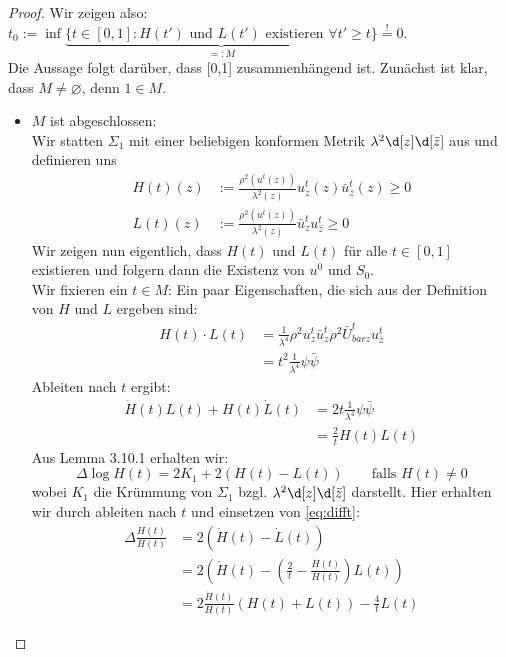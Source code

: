 \begin{proof}
  Wir zeigen also: $t_0 := \inf \underbrace{\{t \in [0,1] : H(t') \text{ und } L(t') \text{ existieren } \forall t' \geq t \}}_{ =: M} \stackrel{!}{=} 0$. \\
  Die Aussage folgt darüber, dass [0,1] zusammenhängend ist. Zunächst ist klar, dass $M \neq \varnothing$, denn $1 \in M$.
  \begin{itemize}
    \item $M$ ist abgeschlossen: \\
      Wir statten $\Sigma_1$ mit einer beliebigen konformen Metrik $\lambda^2 \d[z]\d[\bar z]$ aus und definieren uns
      \begin{align*}
	H(t)(z) & := \frac{\rho^2(u^t(z))}{\lambda^2(z)} u^t_z(z) \bar u^t_{\bar z}(z) \geq 0 \\
	L(t)(z) & := \frac{\rho^2(u^t(z))}{\lambda^2(z)} \bar u^t_z u^t_{\bar z} \geq 0
      \end{align*}
      Wir zeigen nun eigentlich, dass $H(t)$ und $L(t)$ für alle $t \in [0,1]$ existieren und folgern dann die Existenz von $u^0$ und $S_0$. \\
      Wir fixieren ein $t \in M$:
      Ein paar Eigenschaften, die sich aus der Definition von $H$ und $L$ ergeben sind:
      \begin{align*}
	H(t) \cdot L(t) & = \frac{1}{\lambda^4} \rho^2 u^t_z \bar u^t_z \rho^2 \bar U^t_{bar z} u^t_{\bar z} \\
	& = t^2 \frac{1}{\lambda^4} \psi \bar \psi \tag{1} \label{eq:HL}
      \end{align*}
      Ableiten nach $t$ ergibt:
      \begin{align*}
	\dot H(t) L(t) + H(t) \dot L(t) & = 2t \frac{1}{\lambda^4} \psi \bar \psi \\
	& = \frac2t H(t) L(t) \tag{2} \label{eq:difft}
      \end{align*}
      Aus Lemma 3.10.1 erhalten wir:
      \[
      \Delta \log H(t) = 2K_1 + 2(H(t) - L(t)) \qquad \text{falls } H(t) \neq 0 \tag{3} \label{eq:logH}
      \]
      wobei $K_1$ die Krümmung von $\Sigma_1$ bzgl. $\lambda^2\d[z] \d[\bar z]$ darstellt. Hier erhalten wir durch ableiten nach $t$ und einsetzen von \eqref{eq:difft}:
      \begin{align*}
	\Delta \frac{\dot H(t)}{H(t)} & = 2(\dot H(t) - \dot L(t)) \\
	& = 2( \dot H(t) - \left (\frac2t - \frac{\dot H(t)}{H(t)} \right) L(t)) \\
	& = 2 \frac{\dot H(t)}{H(t)}(H(t) + L(t)) - \frac4t L(t)

\end{align*}
\end{itemize}
\end{proof}
